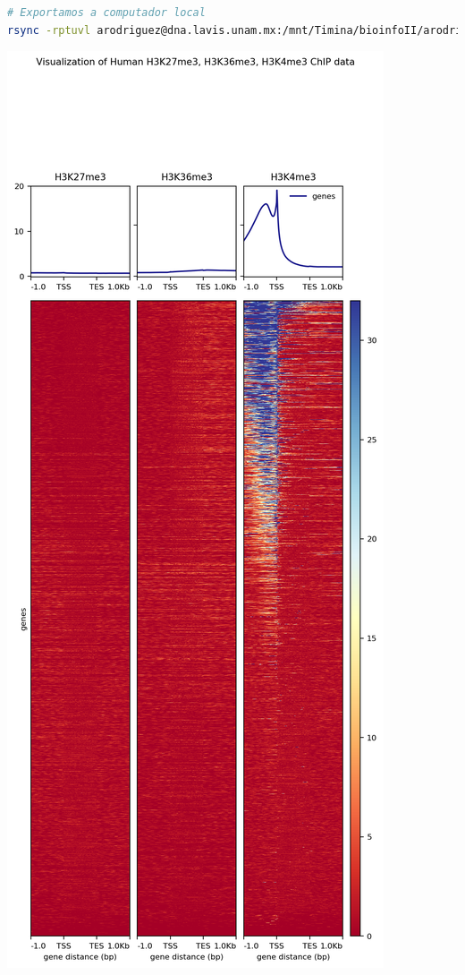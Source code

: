 \documentclass[
]{article}
\begin{document}
\begin{lstlisting}[language=bash]
# Exportamos a computador local
rsync -rptuvl arodriguez@dna.lavis.unam.mx:/mnt/Timina/bioinfoII/arodriguez/Visualization/HistonesHeatmap.png .
\end{lstlisting}

\includegraphics{./T04_images/HistonesHeatmap.png}
\end{document}
